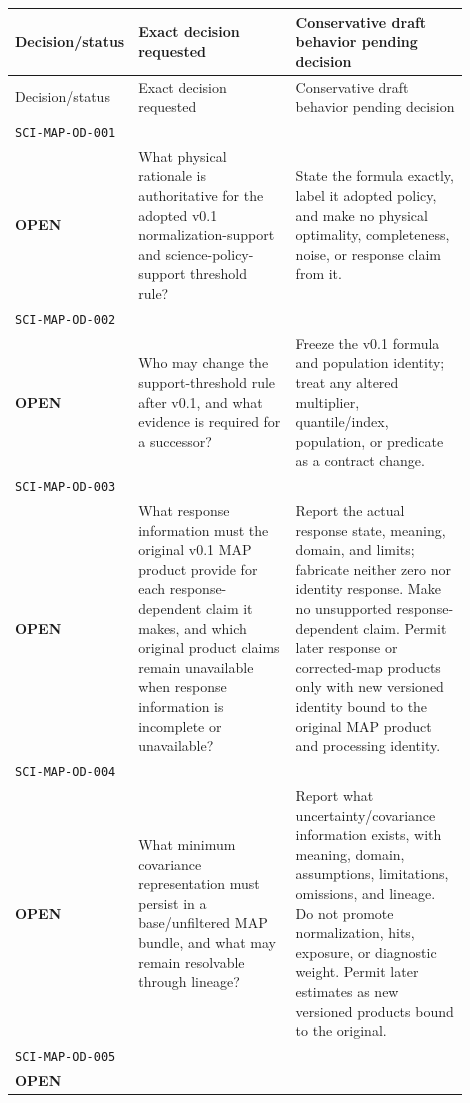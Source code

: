 \begingroup
\small
\setlength{\tabcolsep}{4pt}
\begin{longtable}{L{0.14\linewidth}L{0.37\linewidth}L{0.39\linewidth}}
\toprule
Decision/status & Exact decision requested & Conservative draft behavior pending decision\\
\midrule
\endfirsthead
\toprule
Decision/status & Exact decision requested & Conservative draft behavior pending decision\\
\midrule
\endhead
\texttt{SCI-MAP-OD-001}\\\textbf{OPEN} &
What physical rationale is authoritative for the adopted v0.1 normalization-support and science-policy-support threshold rule? &
State the formula exactly, label it adopted policy, and make no physical optimality, completeness, noise, or response claim from it.\\
\addlinespace[0.35em]
\texttt{SCI-MAP-OD-002}\\\textbf{OPEN} &
Who may change the support-threshold rule after v0.1, and what evidence is required for a successor? &
Freeze the v0.1 formula and population identity; treat any altered multiplier, quantile/index, population, or predicate as a contract change.\\
\addlinespace[0.35em]
\texttt{SCI-MAP-OD-003}\\\textbf{OPEN} &
What response information must the original v0.1 MAP product provide for each response-dependent claim it makes, and which original product claims remain unavailable when response information is incomplete or unavailable? &
Report the actual response state, meaning, domain, and limits; fabricate neither zero nor identity response. Make no unsupported response-dependent claim. Permit later response or corrected-map products only with new versioned identity bound to the original MAP product and processing identity.\\
\addlinespace[0.35em]
\texttt{SCI-MAP-OD-004}\\\textbf{OPEN} &
What minimum covariance representation must persist in a base/unfiltered MAP bundle, and what may remain resolvable through lineage? &
Report what uncertainty/covariance information exists, with meaning, domain, assumptions, limitations, omissions, and lineage. Do not promote normalization, hits, exposure, or diagnostic weight. Permit later estimates as new versioned products bound to the original.\\
\addlinespace[0.35em]
\texttt{SCI-MAP-OD-005}\\\textbf{OPEN} &

\end{longtable}
